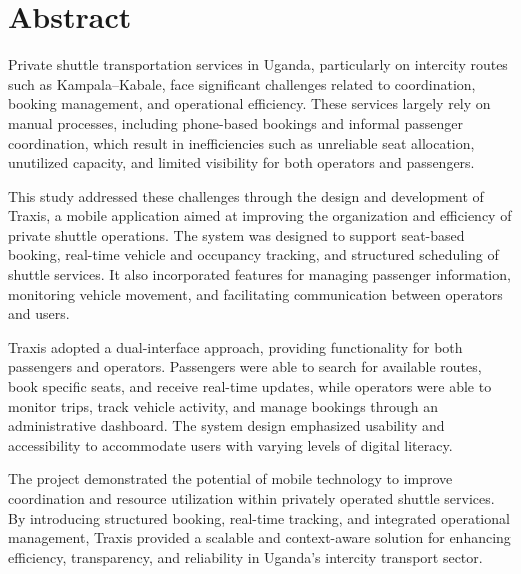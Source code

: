 \chapter*{Abstract}


Private shuttle transportation services in Uganda, particularly on intercity
routes such as Kampala–Kabale, face significant challenges related to
coordination, booking management, and operational efficiency. These services
largely rely on manual processes, including phone-based bookings and informal
passenger coordination, which result in inefficiencies such as unreliable seat
allocation, unutilized capacity, and limited visibility for both operators and
passengers.


This study addressed these challenges through the design and development of
Traxis, a mobile application aimed at improving the organization and efficiency
of private shuttle operations. The system was designed to support seat-based
booking, real-time vehicle and occupancy tracking, and structured scheduling of
shuttle services. It also incorporated features for managing passenger
information, monitoring vehicle movement, and facilitating communication between
operators and users.


Traxis adopted a dual-interface approach, providing functionality for both
passengers and operators. Passengers were able to search for available routes,
book specific seats, and receive real-time updates, while operators were able to
monitor trips, track vehicle activity, and manage bookings through an
administrative dashboard. The system design emphasized usability and
accessibility to accommodate users with varying levels of digital literacy.


The project demonstrated the potential of mobile technology to improve
coordination and resource utilization within privately operated shuttle
services. By introducing structured booking, real-time tracking, and integrated
operational management, Traxis provided a scalable and context-aware solution
for enhancing efficiency, transparency, and reliability in Uganda’s intercity
transport sector.
